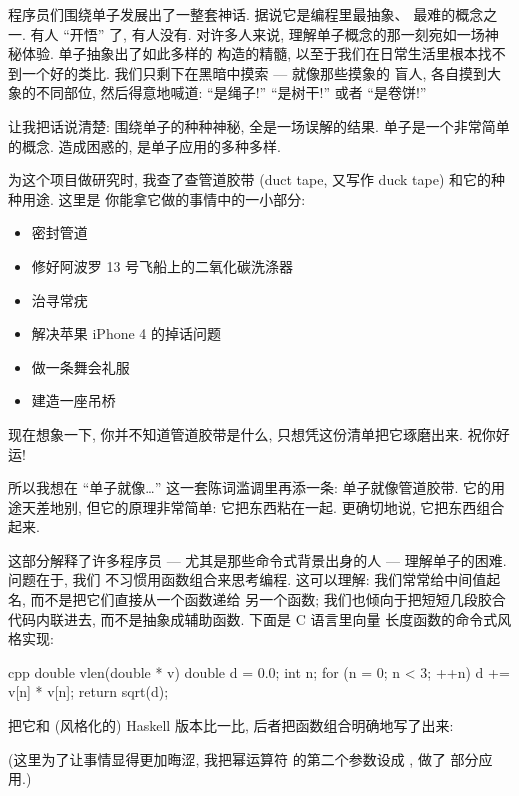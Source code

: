 
\lettrine[lhang=0.17]{程}{序员们围}绕单子发展出了一整套神话. 据说它是编程里最抽象、
最难的概念之一. 有人
``开悟'' 了, 有人没有. 对许多人来说, 理解单子概念的那一刻宛如一场神秘体验. 单子抽象出了如此多样的
构造的精髓, 以至于我们在日常生活里根本找不到一个好的类比. 我们只剩下在黑暗中摸索 --- 就像那些摸象的
盲人, 各自摸到大象的不同部位, 然后得意地喊道: ``是绳子!'' ``是树干!'' 或者 ``是卷饼!''

让我把话说清楚: 围绕单子的种种神秘, 全是一场误解的结果. 单子是一个非常简单的概念. 造成困惑的,
是单子应用的多种多样.

为这个项目做研究时, 我查了查管道胶带 (duct tape, 又写作 duck tape) 和它的种种用途. 这里是
你能拿它做的事情中的一小部分:

\begin{itemize}
  \tightlist
  \item
        密封管道
  \item
        修好阿波罗 13 号飞船上的二氧化碳洗涤器
  \item
        治寻常疣
  \item
        解决苹果 iPhone 4 的掉话问题
  \item
        做一条舞会礼服
  \item
        建造一座吊桥
\end{itemize}

\noindent
现在想象一下, 你并不知道管道胶带是什么, 只想凭这份清单把它琢磨出来. 祝你好运!

所以我想在 ``单子就像\ldots{}'' 这一套陈词滥调里再添一条: 单子就像管道胶带. 它的用途天差地别,
但它的原理非常简单: 它把东西粘在一起. 更确切地说, 它把东西组合起来.

这部分解释了许多程序员 --- 尤其是那些命令式背景出身的人 --- 理解单子的困难. 问题在于, 我们
不习惯用函数组合来思考编程. 这可以理解: 我们常常给中间值起名, 而不是把它们直接从一个函数递给
另一个函数; 我们也倾向于把短短几段胶合代码内联进去, 而不是抽象成辅助函数. 下面是 C 语言里向量
长度函数的命令式风格实现:

\begin{snip}{cpp}
double vlen(double * v) {
    double d = 0.0;
    int n;
    for (n = 0; n < 3; ++n)
        d += v[n] * v[n];
    return sqrt(d);
}
\end{snip}
把它和 (风格化的) Haskell 版本比一比, 后者把函数组合明确地写了出来:

(这里为了让事情显得更加晦涩, 我把幂运算符 \code{(\^{})} 的第二个参数设成 , 做了
部分应用.)

